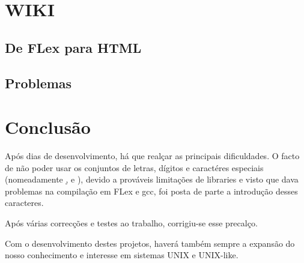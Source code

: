 \documentclass[11pt,a4paper]{report}
\begin{document}
\chapter{WIKI}
\section{De FLex para HTML}

\pagebreak
\section{Problemas}




\chapter{Conclusão}

Após dias de desenvolvimento, há que realçar as principais dificuldades. O facto de não poder usar os conjuntos de letras, dígitos e caractéres especiais (nomeadamente \d, \s e \w), devido a prováveis limitações de libraries e visto que dava problemas na compilação em FLex e gcc, foi posta de parte a introdução desses caracteres.

Após várias correcções e testes ao trabalho, corrigiu-se esse precalço.

Com o desenvolvimento destes projetos, haverá também sempre a expansão do nosso conhecimento e interesse em sistemas UNIX e UNIX-like.
\end{document}
